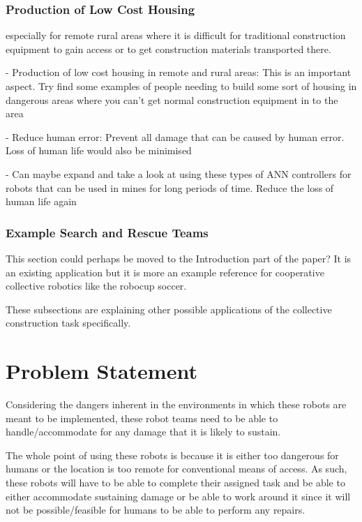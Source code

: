 \subsubsection{Production of Low Cost Housing}

especially for remote rural areas where it is difficult for traditional construction equipment to gain access or to get construction materials transported there.

- Production of low cost housing in remote and rural areas: This is an important aspect. Try find some examples of people needing to build some sort of housing in dangerous areas where you can't get normal construction equipment in to the area

- Reduce human error: Prevent all damage that can be caused by human error. Loss of human life would also be minimised

- Can maybe expand and take a look at using these types of ANN controllers for robots that can be used in mines for long periods of time. Reduce the loss of human life again

\subsubsection{Example Search and Rescue Teams}
This section could perhaps be moved to the Introduction part of the paper? It is an existing application but it is more an example reference for cooperative collective robotics like the robocup soccer.

These subsections are explaining other possible applications of the collective construction task specifically.

\section{Problem Statement}

Considering the dangers inherent in the environments in which these robots are meant to be implemented, these robot teams need to be able to handle/accommodate for any damage that it is likely to sustain.


The whole point of using these robots is because it is either too dangerous for humans or the location is too remote for conventional means of access. As such, these robots will have to be able to complete their assigned task and be able to either accommodate sustaining damage or be able to work around it since it will not be possible/feasible for humans to be able to perform any repairs.

